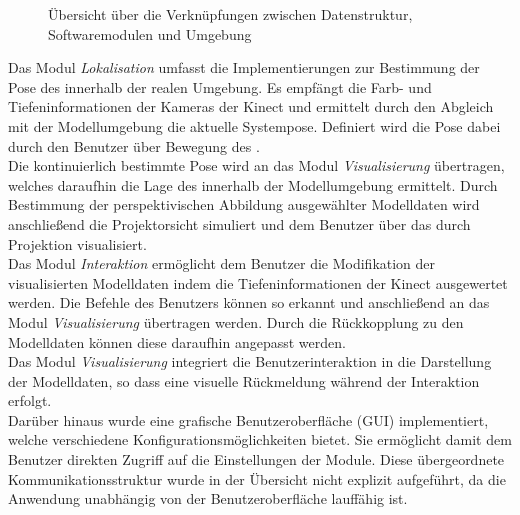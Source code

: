 \begin{figure}[ht]
	\begin{center}%
		\caption{Übersicht über die Verknüpfungen zwischen Datenstruktur, Softwaremodulen und Umgebung}
		\label{fig.modules}
	\end{center}
\end{figure}

\prever{
}

Das Modul \textit{Lokalisation} umfasst die Implementierungen zur Bestimmung der Pose des  innerhalb der realen Umgebung. Es empfängt die Farb- und Tiefeninformationen der Kameras der Kinect und ermittelt durch den Abgleich mit der Modellumgebung die aktuelle Systempose. Definiert wird die Pose dabei durch den Benutzer über Bewegung des .\\
Die kontinuierlich bestimmte Pose wird an das Modul \textit{Visualisierung} übertragen, welches daraufhin die Lage des  innerhalb der Modellumgebung ermittelt. Durch Bestimmung der perspektivischen Abbildung ausgewählter Modelldaten wird anschließend die Projektorsicht simuliert und dem Benutzer über das \kps{} durch Projektion visualisiert.\\ 

Das Modul \textit{Interaktion} ermöglicht dem Benutzer die Modifikation der visualisierten Modelldaten indem die Tiefeninformationen der Kinect ausgewertet werden. Die Befehle des Benutzers können so erkannt und anschließend an das Modul \textit{Visualisierung} übertragen werden. Durch die Rückkopplung zu den Modelldaten können diese daraufhin angepasst werden.\\
Das Modul \textit{Visualisierung} integriert die Benutzerinteraktion in die Darstellung der Modelldaten, so dass eine visuelle Rückmeldung während der Interaktion erfolgt.\\

Darüber hinaus wurde eine grafische Benutzeroberfläche (GUI) implementiert, welche verschiedene Konfigurationsmöglichkeiten bietet. Sie ermöglicht damit dem Benutzer direkten Zugriff auf die Einstellungen der Module. Diese übergeordnete Kommunikationsstruktur wurde in der Übersicht nicht explizit aufgeführt, da die Anwendung unabhängig von der Benutzeroberfläche lauffähig ist.\\

